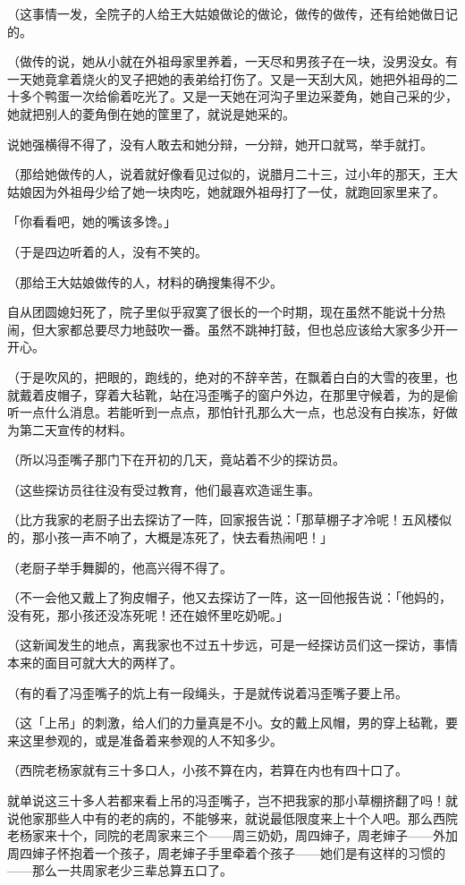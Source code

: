 \documentclass[UTF8]{ctexart}
\begin{document}
（这事情一发，全院子的人给王大姑娘做论的做论，做传的做传，还有给她做日记的。

（做传的说，她从小就在外祖母家里养着，一天尽和男孩子在一块，没男没女。有一天她竟拿着烧火的叉子把她的表弟给打伤了。又是一天刮大风，她把外祖母的二十多个鸭蛋一次给偷着吃光了。又是一天她在河沟子里边采菱角，她自己采的少，她就把别人的菱角倒在她的筐里了，就说是她采的。

说她强横得不得了，没有人敢去和她分辩，一分辩，她开口就骂，举手就打。

（那给她做传的人，说着就好像看见过似的，说腊月二十三，过小年的那天，王大姑娘因为外祖母少给了她一块肉吃，她就跟外祖母打了一仗，就跑回家里来了。

「你看看吧，她的嘴该多馋。」

（于是四边听着的人，没有不笑的。

（那给王大姑娘做传的人，材料的确搜集得不少。

自从团圆媳妇死了，院子里似乎寂寞了很长的一个时期，现在虽然不能说十分热闹，但大家都总要尽力地鼓吹一番。虽然不跳神打鼓，但也总应该给大家多少开一开心。

（于是吹风的，把眼的，跑线的，绝对的不辞辛苦，在飘着白白的大雪的夜里，也就戴着皮帽子，穿着大毡靴，站在冯歪嘴子的窗户外边，在那里守候着，为的是偷听一点什么消息。若能听到一点点，那怕针孔那么大一点，也总没有白挨冻，好做为第二天宣传的材料。

（所以冯歪嘴子那门下在开初的几天，竟站着不少的探访员。

（这些探访员往往没有受过教育，他们最喜欢造谣生事。

（比方我家的老厨子出去探访了一阵，回家报告说：「那草棚子才冷呢！五风楼似的，那小孩一声不响了，大概是冻死了，快去看热闹吧！」

（老厨子举手舞脚的，他高兴得不得了。

（不一会他又戴上了狗皮帽子，他又去探访了一阵，这一回他报告说：「他妈的，没有死，那小孩还没冻死呢！还在娘怀里吃奶呢。」

（这新闻发生的地点，离我家也不过五十步远，可是一经探访员们这一探访，事情本来的面目可就大大的两样了。

（有的看了冯歪嘴子的炕上有一段绳头，于是就传说着冯歪嘴子要上吊。

（这「上吊」的刺激，给人们的力量真是不小。女的戴上风帽，男的穿上毡靴，要来这里参观的，或是准备着来参观的人不知多少。

（西院老杨家就有三十多口人，小孩不算在内，若算在内也有四十口了。

就单说这三十多人若都来看上吊的冯歪嘴子，岂不把我家的那小草棚挤翻了吗！就说他家那些人中有的老的病的，不能够来，就说最低限度来上十个人吧。那么西院老杨家来十个，同院的老周家来三个——周三奶奶，周四婶子，周老婶子——外加周四婶子怀抱着一个孩子，周老婶子手里牵着个孩子——她们是有这样的习惯的——那么一共周家老少三辈总算五口了。
\end{document}
